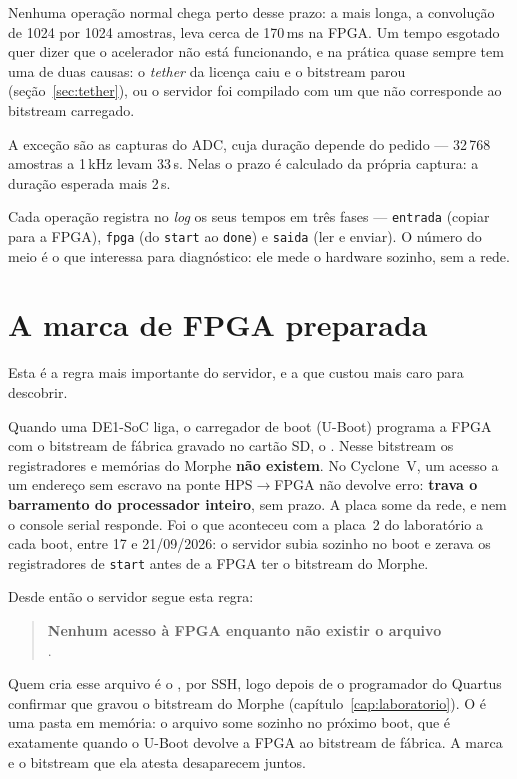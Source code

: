 Nenhuma operação normal chega perto desse prazo: a mais longa, a convolução de
1024 por 1024 amostras, leva cerca de 170\,ms na FPGA. Um tempo esgotado quer
dizer que o acelerador não está funcionando, e na prática quase sempre tem uma
de duas causas: o \emph{tether} da licença caiu e o bitstream parou
(seção~\ref{sec:tether}), ou o servidor foi compilado com um  que
não corresponde ao bitstream carregado.

A exceção são as capturas do ADC, cuja duração depende do pedido --- 32\,768
amostras a 1\,kHz levam 33\,s. Nelas o prazo é calculado da própria captura: a
duração esperada mais 2\,s.

Cada operação registra no \emph{log} os seus tempos em três fases ---
\texttt{entrada} (copiar para a FPGA), \texttt{fpga} (do \texttt{start} ao
\texttt{done}) e \texttt{saida} (ler e enviar). O número do meio é o que
interessa para diagnóstico: ele mede o hardware sozinho, sem a rede.

\section{A marca de FPGA preparada}
\label{sec:marca}

Esta é a regra mais importante do servidor, e a que custou mais caro para
descobrir.

Quando uma DE1-SoC liga, o carregador de boot (U-Boot) programa a FPGA com o
bitstream de fábrica gravado no cartão SD, o . Nesse
bitstream os registradores e memórias do Morphe \textbf{não existem}. No
Cyclone~V, um acesso a um endereço sem escravo na ponte HPS\(\to\)FPGA não
devolve erro: \textbf{trava o barramento do processador inteiro}, sem prazo. A
placa some da rede, e nem o console serial responde. Foi o que aconteceu com a
placa~2 do laboratório a cada boot, entre 17 e 21/09/2026: o servidor subia
sozinho no boot e zerava os registradores de \texttt{start} antes de a FPGA ter
o bitstream do Morphe.

Desde então o servidor segue esta regra:

\begin{quote}
\textbf{Nenhum acesso à FPGA enquanto não existir o arquivo}\\
.
\end{quote}

Quem cria esse arquivo é o , por SSH, logo depois de o
programador do Quartus confirmar que gravou o bitstream do Morphe
(capítulo~\ref{cap:laboratorio}). O  é uma pasta em memória: o
arquivo some sozinho no próximo boot, que é exatamente quando o U-Boot devolve
a FPGA ao bitstream de fábrica. A marca e o bitstream que ela atesta
desaparecem juntos.

